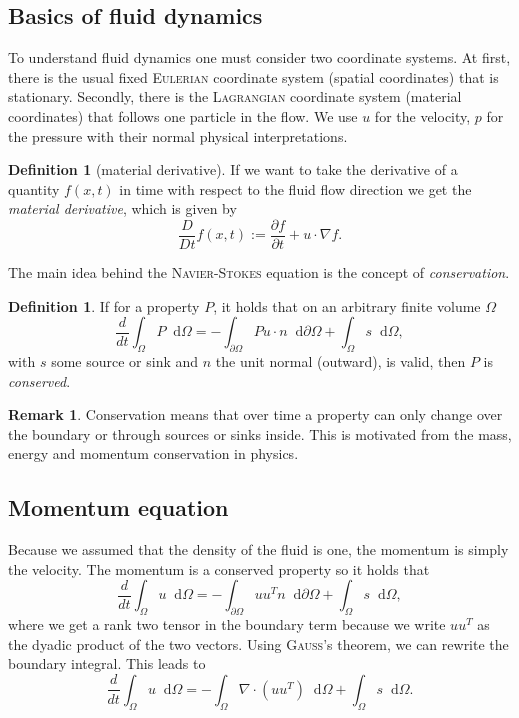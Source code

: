 \documentclass[12pt,a4paper,twoside, open=right]{scrreprt}
\theoremstyle{definition}
\newtheorem{rem}[auf]{Remark}
\newtheorem{defn}[auf]{Definition}
\theoremstyle{plain}
\newcommand{\D}{\mathop{}\!\mathrm{d}}
\begin{document}
\subsection{Basics of fluid dynamics}
To understand fluid dynamics one must consider two coordinate systems. At first, there is the usual fixed \textsc{Eulerian} coordinate system (spatial coordinates) that is stationary. Secondly, there is the \textsc{Lagrangian} coordinate system (material coordinates) that follows one particle in the flow. 
We use $u$ for the velocity, $p$ for the pressure with their normal physical interpretations.
\begin{defn}[material derivative]
    If we want to take the derivative of a quantity $f(x,t)$ in time with respect to the fluid flow direction we get the \emph{material derivative}, which is given by 
    \begin{equation}
        \frac{D}{Dt}f(x,t):=\frac{\partial f}{\partial t} + u\cdot\nabla f.
    \end{equation}
\end{defn}

The main idea behind the \textsc{Navier-Stokes} equation is the concept of \emph{conservation}. 
\begin{defn}
    If for a property $P$, it holds that on an arbitrary finite volume $\Omega$
    \begin{equation}
        \frac{d}{dt}\int_\Omega P\D\Omega = -\int_{\partial\Omega}Pu\cdot n\D\partial\Omega+\int_\Omega s\D\Omega,\label{eq:conservation}
    \end{equation}
   with $s$ some source or sink and $n$ the unit normal (outward), is valid, then $P$ is \emph{conserved}.
\end{defn}
\begin{rem}
    Conservation means that over time a property can only change over the boundary or through sources or sinks inside. This is motivated from the mass, energy and momentum conservation in physics.
\end{rem}
\subsection{Momentum equation}
Because we assumed that the density of the fluid is one, the momentum is simply the velocity. The momentum is a conserved property so it holds that
\begin{equation}
    \frac{d}{dt}\int_\Omega u\D\Omega = -\int_{\partial\Omega}uu^Tn\D\partial\Omega +\int_\Omega s\D\Omega,
\end{equation} where we get a rank two tensor in the boundary term because we write $uu^T$ as the dyadic product of the two vectors. Using \textsc{Gauß}'s theorem, we can rewrite the boundary integral. This leads to 
\begin{equation}
    \frac{d}{dt}\int_\Omega u\D\Omega = -\int_\Omega \nabla\cdot(uu^T)\D\Omega +\int_\Omega s\D\Omega.
\end{equation}
\end{document}
